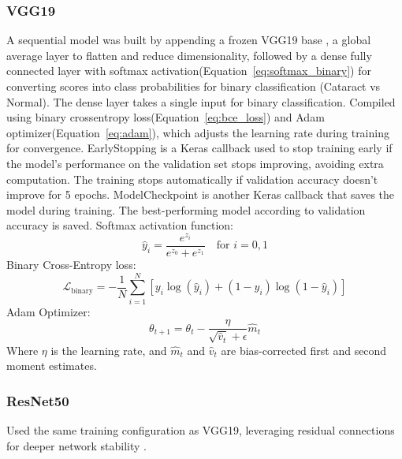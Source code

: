 \documentclass{ijclclp}
\begin{document}
\subsubsection{VGG19}
A sequential model was built by appending a frozen VGG19 base \cite{vggmedium}, a global average layer to flatten and reduce dimensionality, followed by a dense fully connected layer with softmax activation(Equation~\eqref{eq:softmax_binary}) for converting scores into class probabilities for binary classification (Cataract vs Normal). The dense layer takes a single input for binary classification. Compiled using binary crossentropy loss(Equation~\eqref{eq:bce_loss}) and Adam optimizer(Equation~\eqref{eq:adam}), which adjusts the learning rate during training for convergence. EarlyStopping is a Keras callback used to stop training early if the model’s performance on the validation set stops improving, avoiding extra computation. The training stops automatically if validation accuracy doesn't improve for 5 epochs. ModelCheckpoint is another Keras callback that saves the model during training. The best-performing model according to validation accuracy is saved. 
    \newline
Softmax activation function:
    \begin{equation}
    \hat{y}_i = \frac{e^{z_i}}{e^{z_0} + e^{z_1}} \quad \text{for } i = 0, 1
    \label{eq:softmax_binary}
    \end{equation}
\newline
Binary Cross-Entropy loss:
    \begin{equation}
    \mathcal{L}_{\text{binary}} = -\frac{1}{N} \sum_{i=1}^{N} \left[y_i \log(\hat{y}_i) + (1 - y_i)\log(1 - \hat{y}_i)\right]
    \label{eq:bce_loss}
    \end{equation}
\newline
Adam Optimizer:
    \begin{equation}
    \theta_{t+1} = \theta_t - \frac{\eta}{\sqrt{\hat{v}_t} + \epsilon} \hat{m}_t
    \label{eq:adam}
    \end{equation}
\newline
Where $\eta$ is the learning rate, and $\hat{m}_t$ and $\hat{v}_t$ are bias-corrected first and second moment estimates.

    \subsubsection{ResNet50}Used the same training configuration as VGG19, leveraging residual connections for deeper network stability \cite{resnet50medium}.
\end{document}
